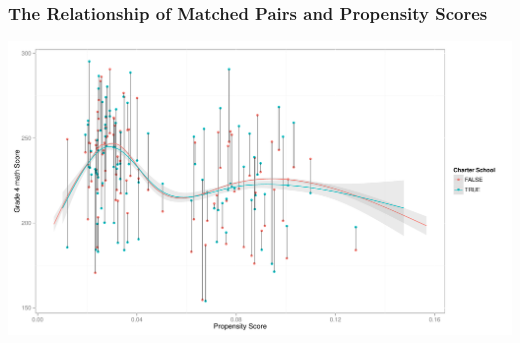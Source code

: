 \documentclass[10pt,handout,mathserif]{beamer}
\begin{document}
\begin{frame}
    \frametitle{The Relationship of Matched Pairs and Propensity Scores}
    \begin{center}
    	\includegraphics[width=\textwidth,keepaspectratio]{../Figures2009/g4math-loess-matching}
    \end{center}
\end{frame}
\end{document}

